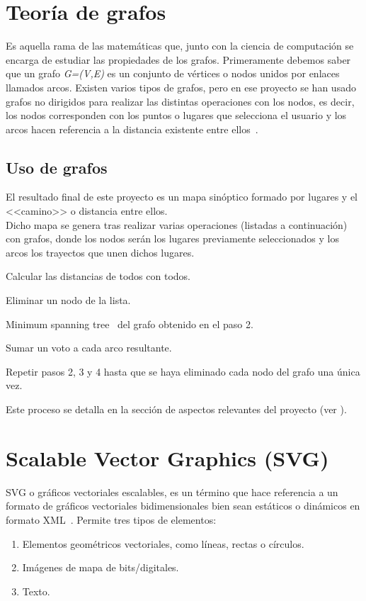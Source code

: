 \section{Teoría de grafos}
Es aquella rama de las matemáticas que, junto con la ciencia de computación se encarga de estudiar las propiedades de los grafos. Primeramente debemos saber que un grafo \textit{G=(V,E)} es un conjunto de vértices o nodos unidos por enlaces llamados arcos.
Existen varios tipos de grafos, pero en ese proyecto se han usado grafos no dirigidos para realizar las distintas operaciones con los nodos, es decir, los nodos corresponden con los puntos o lugares que selecciona el usuario y los arcos hacen referencia a la distancia existente entre ellos~\cite{wiki:tgrafos}. 

\subsection{Uso de grafos}
El resultado final de este proyecto es un mapa sinóptico formado por lugares y el <<camino>> o distancia entre ellos.\\


Dicho mapa se genera tras realizar varias operaciones (listadas a continuación) con grafos, donde los nodos serán los lugares previamente seleccionados y los arcos los trayectos que unen dichos lugares.

\begin{steps}
	\item Calcular las distancias de todos con todos.
	\item Eliminar un nodo de la lista.
	\item Minimum spanning tree~\cite{wiki:minimum-spanning-tree} del grafo obtenido en el paso 2.
	\item Sumar un voto a cada arco resultante.
	\item Repetir pasos 2, 3 y 4 hasta que se haya eliminado cada nodo del grafo una única vez.
\end{steps}

Este proceso se detalla en la sección de aspectos relevantes del proyecto (ver ).


\section{Scalable Vector Graphics (SVG)}
SVG o gráficos vectoriales escalables, es un término que hace referencia a un formato de gráficos vectoriales bidimensionales bien sean estáticos o dinámicos en formato XML~\cite{wiki:xml}.
Permite tres tipos de elementos:
\begin{enumerate}
	\item Elementos geométricos vectoriales, como líneas, rectas o círculos.
	\item Imágenes de mapa de bits/digitales.
	\item Texto.
\end{enumerate}


